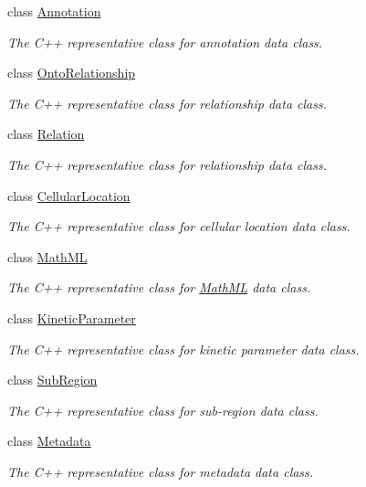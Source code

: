 \begin{DoxyCompactItemize}
class \hyperlink{classunisys_1_1Annotation}{Annotation}
\begin{DoxyCompactList}\small\item\em The C++ representative class for annotation data class. \end{DoxyCompactList}\item 
class \hyperlink{classunisys_1_1OntoRelationship}{Onto\-Relationship}
\begin{DoxyCompactList}\small\item\em The C++ representative class for relationship data class. \end{DoxyCompactList}\item 
class \hyperlink{classunisys_1_1Relation}{Relation}
\begin{DoxyCompactList}\small\item\em The C++ representative class for relationship data class. \end{DoxyCompactList}\item 
class \hyperlink{classunisys_1_1CellularLocation}{Cellular\-Location}
\begin{DoxyCompactList}\small\item\em The C++ representative class for cellular location data class. \end{DoxyCompactList}\item 
class \hyperlink{classunisys_1_1MathML}{Math\-M\-L}
\begin{DoxyCompactList}\small\item\em The C++ representative class for \hyperlink{classunisys_1_1MathML}{Math\-M\-L} data class. \end{DoxyCompactList}\item 
class \hyperlink{classunisys_1_1KineticParameter}{Kinetic\-Parameter}
\begin{DoxyCompactList}\small\item\em The C++ representative class for kinetic parameter data class. \end{DoxyCompactList}\item 
class \hyperlink{classunisys_1_1SubRegion}{Sub\-Region}
\begin{DoxyCompactList}\small\item\em The C++ representative class for sub-\/region data class. \end{DoxyCompactList}\item 
class \hyperlink{classunisys_1_1Metadata}{Metadata}
\begin{DoxyCompactList}\small\item\em The C++ representative class for metadata data class. \end{DoxyCompactList}\item 

\end{DoxyCompactItemize}
